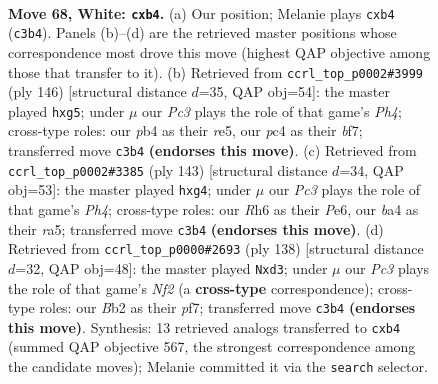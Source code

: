 \documentclass[11pt]{article}
\begin{document}
\clearpage

\begin{figure}[p]\centering
\begin{subfigure}{0.46\textwidth}\centering
\resizebox{\linewidth}{!}{%
\newchessgame
\chessboard[
  setfen={8/4k3/7R/p5r1/bpp5/P1P5/1B1K4/8 w - - 0 68},
  showmover=false,
  pgfstyle=straightmove, color=movearrow, markmove={c3-b4}
]}
\caption{}
\end{subfigure}\hfill
\begin{subfigure}{0.46\textwidth}\centering
\resizebox{\linewidth}{!}{%
\newchessgame
\chessboard[
  setfen={1R6/5bk1/2p5/4r1p1/4P2P/5BK1/8/8 w - - 0 74},
  showmover=false,
  pgfstyle=straightmove, color=movearrow, markmove={h4-g5}
]}
\caption{}
\end{subfigure}
\\[4pt]
\begin{subfigure}{0.46\textwidth}\centering
\resizebox{\linewidth}{!}{%
\newchessgame
\chessboard[
  setfen={8/8/4p1k1/R5pp/P1K1P1P1/7P/8/6r1 b - - 0 72},
  showmover=false,
  pgfstyle=straightmove, color=movearrow, markmove={h5-g4}
]}
\caption{}
\end{subfigure}\hfill
\begin{subfigure}{0.46\textwidth}\centering
\resizebox{\linewidth}{!}{%
\newchessgame
\chessboard[
  setfen={6k1/5p2/4p3/4PP2/5BP1/3p4/5NK1/r7 w - - 12 70},
  showmover=false,
  pgfstyle=straightmove, color=movearrow, markmove={f2-d3}
]}
\caption{}
\end{subfigure}
\caption{\textbf{Move 68, White: \texttt{cxb4}.} (a) Our position; Melanie plays \texttt{cxb4} (\texttt{c3b4}). Panels (b)--(d) are the retrieved master positions whose correspondence most drove this move (highest QAP objective among those that transfer to it). (b) Retrieved from \texttt{ccrl\_top\_p0002\#3999} (ply 146) [structural distance $d$=35, QAP obj=54]: the master played \texttt{hxg5}; under $\mu$ our \emph{Pc3} plays the role of that game's \emph{Ph4}; cross-type roles: our \emph{p}b4 as their \emph{r}e5, our \emph{p}c4 as their \emph{b}f7; transferred move \texttt{c3b4} \textbf{(endorses this move)}. (c) Retrieved from \texttt{ccrl\_top\_p0002\#3385} (ply 143) [structural distance $d$=34, QAP obj=53]: the master played \texttt{hxg4}; under $\mu$ our \emph{Pc3} plays the role of that game's \emph{Ph4}; cross-type roles: our \emph{R}h6 as their \emph{P}e6, our \emph{b}a4 as their \emph{r}a5; transferred move \texttt{c3b4} \textbf{(endorses this move)}. (d) Retrieved from \texttt{ccrl\_top\_p0000\#2693} (ply 138) [structural distance $d$=32, QAP obj=48]: the master played \texttt{Nxd3}; under $\mu$ our \emph{Pc3} plays the role of that game's \emph{Nf2} (a \textbf{cross-type} correspondence); cross-type roles: our \emph{B}b2 as their \emph{p}f7; transferred move \texttt{c3b4} \textbf{(endorses this move)}. Synthesis: 13 retrieved analogs transferred to \texttt{cxb4} (summed QAP objective 567, the strongest correspondence among the candidate moves); Melanie committed it via the \texttt{search} selector.}
\label{fig:thought-m134}
\end{figure}
\end{document}
